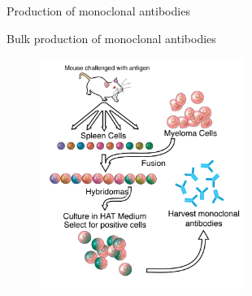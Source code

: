 \begin{frame}{Production of monoclonal antibodies}
    \begin{block}{Bulk production of monoclonal antibodies}
        \begin{figure}
            \centering
            \includegraphics[width=0.6\textwidth]{../Images/mab_hybridomas.png}
        \end{figure}  
        
    \end{block}
\end{frame}

